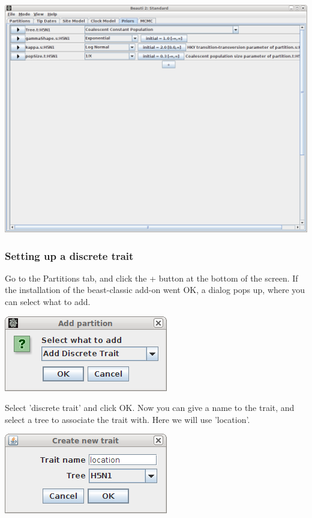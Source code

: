 \documentclass{article}
\begin{document}
\includegraphics[scale=0.4,clip=true,trim=0 300 0 0]{figures/BEAUti_priors.png}


\subsubsection*{Setting up a discrete trait}

Go to the Partitions tab, and click the + button at the bottom of the screen.
If the installation of the beast-classic add-on went OK, a dialog pops up, where you can select what to add.

\includegraphics[scale=0.4]{figures/BEAUti_trait.png}

Select 'discrete trait' and click OK. Now you can give a name to the trait, and select a tree to associate the trait with. 
Here we will use 'location'.

\includegraphics[scale=0.4,clip=true,trim=240 200 240 200]{figures/BEAUti_trait2.png}
\end{document}
